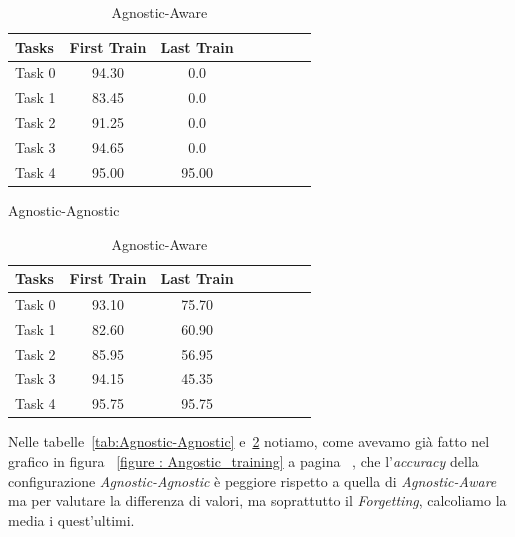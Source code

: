 \begin{table}[!htb]
\begin{minipage}{.5\linewidth}
    \centering

    \label{tab:Agnostic-Agnostic }

    \medskip

\begin{tabular}{l*{6}{c}r}
Tasks   & First Train & Last Train\\
\hline
   Task 0      &     94.30      &      0.0\\
   Task 1      &     83.45      &      0.0\\
   Task 2      &     91.25      &      0.0\\
   Task 3      &     94.65      &      0.0\\
   Task 4      &     95.00      &      95.00\\
\end{tabular}
\caption{Agnostic-Agnostic}
\label{tab:Agnostic-Agnostic}
\end{minipage}\hfill
\begin{minipage}{.5\linewidth}
    \centering

    \label{tab:Agnostic-Aware}

    \medskip

\begin{tabular}{l*{6}{c}r}
Tasks   & First Train  & Last Train\\
\hline
   Task 0      &     93.10      &      75.70\\
   Task 1      &     82.60      &      60.90\\
   Task 2      &     85.95      &      56.95\\
   Task 3      &     94.15      &      45.35\\
   Task 4      &     95.75      &      95.75\\
\end{tabular}
\caption{Agnostic-Aware}
\label{tab:Agnostic-Aware}
\end{minipage}
\end{table}
\newline
Nelle tabelle~\ref{tab:Agnostic-Agnostic} e~\ref{tab:Agnostic-Aware} notiamo, come avevamo già fatto nel grafico in figura ~\ref{figure : Angostic_training} a pagina ~\pageref{figure : Angostic_training}, che l'\textit{accuracy} della configurazione \textit{Agnostic-Agnostic} è peggiore rispetto a quella di \textit{Agnostic-Aware} ma per valutare la differenza di valori, ma soprattutto il \textit{Forgetting}, calcoliamo la media i quest'ultimi.
